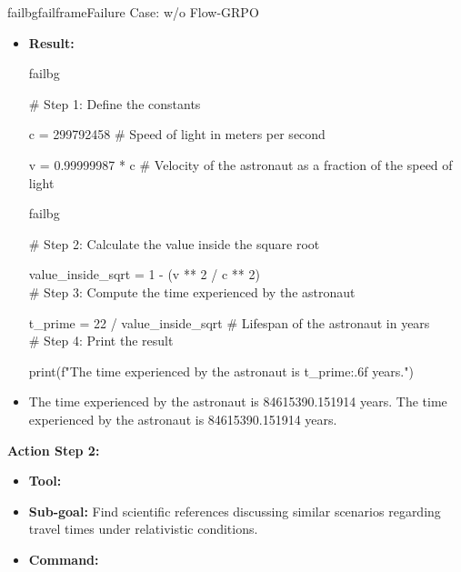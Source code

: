 \begin{small}
\begin{center}
\begin{casebox}{failbg}{failframe}{Failure Case: \model w/o Flow-GRPO}
\begin{itemize}[nosep, leftmargin=*]
        \item \textbf{Result:}
        \begin{casecode}{failbg}

\hspace{0mm}\# Step 1: Define the constants

\hspace{0mm}c = 299792458  \# Speed of light in meters per second

\hspace{0mm}v = 0.99999987 * c  \# Velocity of the astronaut as a fraction of the speed of light
\\

        \end{casecode}
        \begin{casecode}{failbg}
        
\hspace{0mm}\# Step 2: Calculate the value inside the square root

\hspace{0mm}value\_inside\_sqrt = 1 - (v ** 2 / c ** 2)
\\

\hspace{0mm}\# Step 3: Compute the time experienced by the astronaut

\hspace{0mm}t\_prime = 22 / value\_inside\_sqrt  \# Lifespan of the astronaut in years
\\

\hspace{0mm}\# Step 4: Print the result

\hspace{0mm}print(f"The time experienced by the astronaut is {t\_prime:.6f} years.")
\end{casecode}

\item The time experienced by the astronaut is 84615390.151914 years.
        The time experienced by the astronaut is 84615390.151914 years.
    \end{itemize}

    \vspace{1em}

    \textbf{Action Step 2:}
    \begin{itemize}[nosep, leftmargin=*]
        \item \textbf{Tool:} 
        \item \textbf{Sub-goal:} Find scientific references discussing similar scenarios regarding travel times under relativistic conditions.
        \item \textbf{Command:}


\end{itemize}
\end{casebox}
\end{center}
\end{small}
